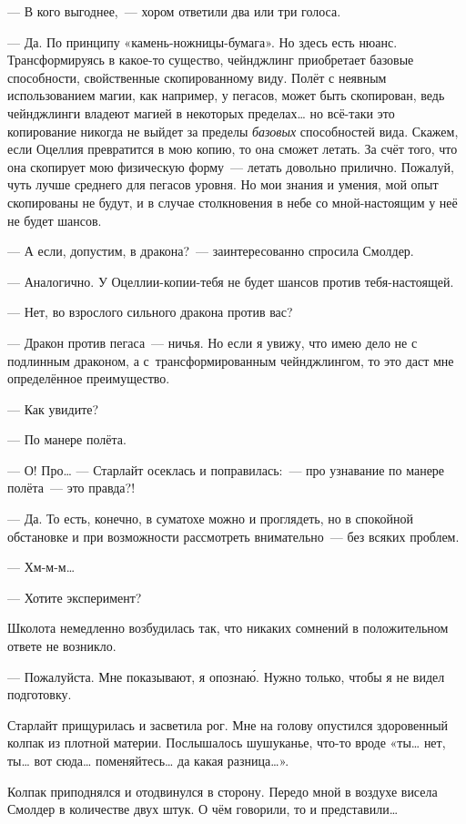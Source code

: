 \documentclass[fontsize=11pt,a5paper,titlepage=firstcover]{scrbook}
\begin{document}
--- В кого выгоднее,~--- хором ответили два или три голоса.

--- Да. По принципу «камень-ножницы-бумага». Но здесь есть нюанс. Трансформируясь в какое-то существо, чейнджлинг приобретает базовые способности, свойственные скопированному виду. Полёт с неявным использованием магии, как например, у пегасов, может быть скопирован, ведь чейнджлинги владеют магией в некоторых пределах{\ldots} но всё-таки это копирование никогда не выйдет за пределы \emph{базовых} способностей вида. Скажем, если Оцеллия превратится в мою копию, то она сможет летать. За счёт того, что она скопирует мою физическую форму~--- летать довольно прилично. Пожалуй, чуть лучше среднего для пегасов уровня. Но мои знания и умения, мой опыт скопированы не будут, и в случае столкновения в небе со мной-настоящим у неё не будет шансов.

--- А если, допустим, в дракона?~--- заинтересованно спросила Смолдер.

--- Аналогично. У Оцеллии-копии-тебя не будет шансов против тебя-настоящей.

--- Нет, во взрослого сильного дракона против вас?

--- Дракон против пегаса~--- ничья. Но если я увижу, что имею дело не с подлинным драконом, а с~трансформированным чейнджлингом, то это даст мне определённое преимущество.

--- Как увидите?

--- По манере полёта.

--- О! Про{\ldots} --- Старлайт осеклась и поправилась:~--- про узнавание по манере полёта~--- это правда?!

--- Да. То есть, конечно, в суматохе можно и проглядеть, но в спокойной обстановке и при возможности рассмотреть внимательно~--- без всяких проблем.

--- Хм-м-м{\ldots}

--- Хотите эксперимент?

Школота немедленно возбудилась так, что никаких сомнений в положительном ответе не возникло.

--- Пожалуйста. Мне показывают, я опознаю́. Нужно только, чтобы я не видел подготовку.

Старлайт прищурилась и засветила рог. Мне на голову опустился здоровенный колпак из плотной материи. Послышалось шушуканье, что-то вроде «ты{\ldots} нет, ты{\ldots} вот сюда{\ldots} поменяйтесь{\ldots} да какая разница{\ldots}».

Колпак приподнялся и отодвинулся в сторону. Передо мной в воздухе висела Смолдер в количестве двух штук. О чём говорили, то и представили{\ldots}
\end{document}
